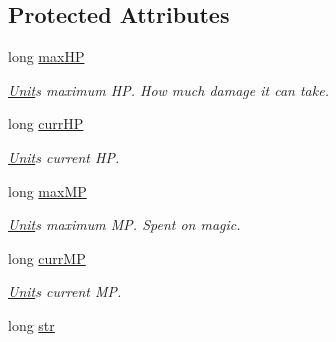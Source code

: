\subsection*{Protected Attributes}
\begin{DoxyCompactItemize}
\item 
long \hyperlink{class_unit_a331291f9274b46a302dc8307518531bb}{max\+HP}\hypertarget{class_unit_a331291f9274b46a302dc8307518531bb}{}\label{class_unit_a331291f9274b46a302dc8307518531bb}

\begin{DoxyCompactList}\small\item\em \hyperlink{class_unit}{Unit}\textquotesingle{}s maximum HP. How much damage it can take. \end{DoxyCompactList}\item 
long \hyperlink{class_unit_ae49498774522534a20fd57f66ab02139}{curr\+HP}\hypertarget{class_unit_ae49498774522534a20fd57f66ab02139}{}\label{class_unit_ae49498774522534a20fd57f66ab02139}

\begin{DoxyCompactList}\small\item\em \hyperlink{class_unit}{Unit}\textquotesingle{}s current HP. \end{DoxyCompactList}\item 
long \hyperlink{class_unit_a57ededefde2dabd71af319b47a3fb2b3}{max\+MP}\hypertarget{class_unit_a57ededefde2dabd71af319b47a3fb2b3}{}\label{class_unit_a57ededefde2dabd71af319b47a3fb2b3}

\begin{DoxyCompactList}\small\item\em \hyperlink{class_unit}{Unit}\textquotesingle{}s maximum MP. Spent on magic. \end{DoxyCompactList}\item 
long \hyperlink{class_unit_ad255c1831ff2c325fa440a1f75c32116}{curr\+MP}\hypertarget{class_unit_ad255c1831ff2c325fa440a1f75c32116}{}\label{class_unit_ad255c1831ff2c325fa440a1f75c32116}

\begin{DoxyCompactList}\small\item\em \hyperlink{class_unit}{Unit}\textquotesingle{}s current MP. \end{DoxyCompactList}\item 
long \hyperlink{class_unit_ae16d1afcf81a2f64275c0f04923df65a}{str}\hypertarget{class_unit_ae16d1afcf81a2f64275c0f04923df65a}{}\label{class_unit_ae16d1afcf81a2f64275c0f04923df65a}


\end{DoxyCompactItemize}
